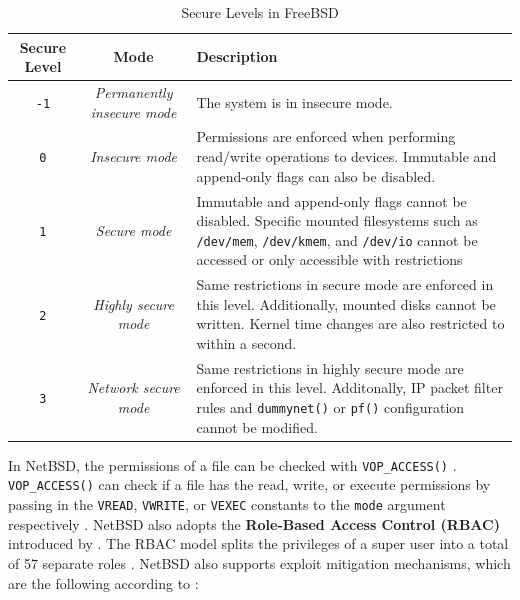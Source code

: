 \begin{table}[!htb]
	\centering
	\begin{tabular}{|c|c|p{}|}
		\hline
		\textbf{Secure Level} & \textbf{Mode}                      & \textbf{Description}                                                                                                                                                                                         \\
		\hline\hline
		\texttt{-1}           & \textit{Permanently insecure mode} & The system is in insecure mode.                                                                                                                                                                              \\ \hline
		\texttt{0}            & \textit{Insecure mode}             & Permissions are enforced when performing read/write operations to devices. Immutable and append-only flags can also be disabled.                                                                             \\ \hline
		\texttt{1}            & \textit{Secure mode}               & Immutable and append-only flags cannot be disabled. Specific mounted filesystems such as \texttt{/dev/mem}, \texttt{/dev/kmem}, and \texttt{/dev/io} cannot be accessed or only accessible with restrictions \\ \hline
		\texttt{2}            & \textit{Highly secure mode}        & Same restrictions in secure mode are enforced in this level. Additionally, mounted disks cannot be written. Kernel time changes are also restricted to within a second.                                      \\ \hline
		\texttt{3}            & \textit{Network secure mode}       & Same restrictions in highly secure mode are enforced in this level. Additonally, IP packet filter rules and \texttt{dummynet()} or \texttt{pf()} configuration cannot be modified.                           \\ \hline
	\end{tabular}
	\caption{Secure Levels in FreeBSD \parencite{freebsd_securelevel}}
	\label{securelevel}
\end{table}

In NetBSD, the permissions of a file can be checked with \texttt{VOP\_ACCESS()} \parencites{netbsd_vnodeops}{netbsd_internals}.
\texttt{VOP\_ACCESS()} can check if a file has the read, write, or execute permissions by passing in the \texttt{VREAD}, \texttt{VWRITE},
or \texttt{VEXEC} constants to the \texttt{mode} argument respectively \parencite{netbsd_vnodeops}. NetBSD also adopts the
\textbf{Role-Based Access Control (RBAC)} introduced by \textcite{crooks2009}. The RBAC model splits the privileges of a super user into
a total of 57 separate roles \parencite{crooks2009}. NetBSD also supports exploit mitigation mechanisms, which are the following according
to \textcite{netbsd_security}:

